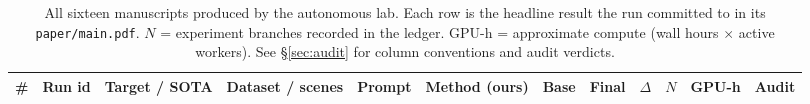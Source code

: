 \renewcommand{\arraystretch}{1.18}
\begin{table}[t]
\centering
\footnotesize
\setlength{\tabcolsep}{3.0pt}
\caption{All sixteen manuscripts produced by the autonomous lab.  Each
row is the headline result the run committed to in its
\texttt{paper/main.pdf}.  $N$ = experiment branches recorded in the
ledger.  GPU-h = approximate compute (wall hours $\times$ active
workers).  See \S\ref{sec:audit} for column conventions and audit
verdicts.}
\label{tab:audit}
\begin{tabular}{@{}c l p{1.55cm} p{2.05cm} c p{1.85cm} r r r r r c@{}}
\toprule
\# & Run id & Target / SOTA & Dataset / scenes & Prompt & Method (ours) &
   Base & Final & $\Delta$ & $N$ & GPU-h & Audit \\
\midrule


\end{tabular}
\end{table}
